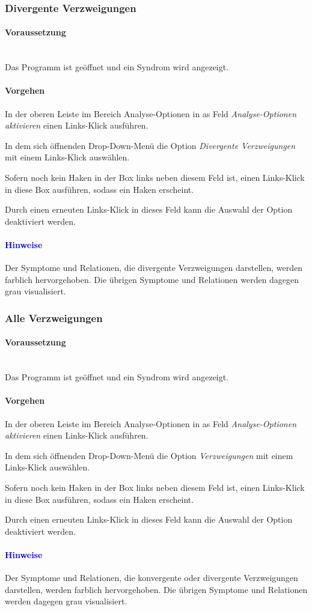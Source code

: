 \documentclass[enabledeprecatedfontcommands,fontsize=11pt,paper=a4,twoside]{scrartcl}
\newcounter{one}
\newcounter{two}[one]
\newcommand*{\hint}{\paragraph{\textcolor{blue}{Hinweise}}}
\newcommand*{\condition}{\paragraph{Voraussetzung}$\;$ \vspace{0.2cm}\\}
\newcommand*{\action}{\paragraph{Vorgehen}}
\let\tempone\itemize
\let\temptwo\enditemize
\renewenvironment{itemize}{\tempone\addtolength{\itemsep}{-10.0pt}}{\temptwo}
\let\origenumerate\enumerate
\let\origendenumerate\endenumerate
\renewenvironment{enumerate}{\origenumerate \addtolength{\itemsep}{-10.0pt}}{\origendenumerate}
\begin{document}
\subsubsection{Divergente Verzweigungen}
	\condition 
	Das Programm ist geöffnet und ein Syndrom wird angezeigt.
	\action
	\begin{enumerate}
		\item In der oberen Leiste im Bereich Analyse-Optionen in as Feld \textit{Analyse-Optionen aktivieren} einen Links-Klick ausführen.
		\item In dem sich öffnenden Drop-Down-Menü die Option \textit{Divergente Verzweigungen} mit einem Links-Klick auswählen. 
		\item Sofern noch kein Haken in der Box links neben diesem Feld ist, einen Links-Klick in diese Box ausführen, sodass ein Haken erscheint.
		\item Durch einen erneuten Links-Klick in dieses Feld kann die Auswahl der Option deaktiviert werden.
	\end{enumerate} 
	\hint
	\begin{itemize}
		\item Der Symptome und Relationen, die divergente Verzweigungen darstellen, werden farblich hervorgehoben. Die übrigen Symptome und Relationen werden dagegen grau visualisiert. \\
	\end{itemize}
\newpage
\subsubsection{Alle Verzweigungen}
	\condition 
	Das Programm ist geöffnet und ein Syndrom wird angezeigt.
	\action
	\begin{enumerate}
		\item In der oberen Leiste im Bereich Analyse-Optionen in as Feld \textit{Analyse-Optionen aktivieren} einen Links-Klick ausführen.
		\item In dem sich öffnenden Drop-Down-Menü die Option \textit{Verzweigungen} mit einem Links-Klick auswählen. 
		\item Sofern noch kein Haken in der Box links neben diesem Feld ist, einen Links-Klick in diese Box ausführen, sodass ein Haken erscheint.
		\item Durch einen erneuten Links-Klick in dieses Feld kann die Auswahl der Option deaktiviert werden.
	\end{enumerate} 
	\hint
	\begin{itemize}
		\item Der Symptome und Relationen, die konvergente oder divergente Verzweigungen darstellen, werden farblich hervorgehoben. Die übrigen Symptome und Relationen werden dagegen grau visualisiert. \\
	\end{itemize}
\end{document}
